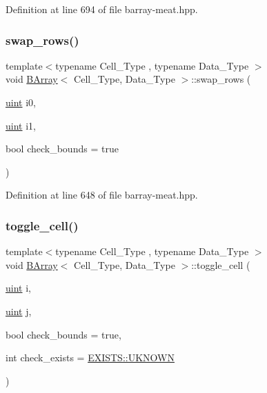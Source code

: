 Definition at line 694 of file barray-\/meat.\+hpp.

\mbox{\label{group__barray-insert_ga742773803481c18e2865b2b2a1e68949}} 
\subsubsection{\texorpdfstring{swap\+\_\+rows()}{swap\_rows()}}
{\footnotesize\ttfamily template$<$typename Cell\+\_\+\+Type , typename Data\+\_\+\+Type $>$ \\
void \hyperlink{class_b_array}{B\+Array}$<$ Cell\+\_\+\+Type, Data\+\_\+\+Type $>$\+::swap\+\_\+rows (\begin{DoxyParamCaption}\item[{\hyperlink{typedefs_8hpp_a91ad9478d81a7aaf2593e8d9c3d06a14}{uint}}]{i0,  }\item[{\hyperlink{typedefs_8hpp_a91ad9478d81a7aaf2593e8d9c3d06a14}{uint}}]{i1,  }\item[{bool}]{check\+\_\+bounds = {\ttfamily true} }\end{DoxyParamCaption})\hspace{0.3cm}{\ttfamily [inline]}}



Definition at line 648 of file barray-\/meat.\+hpp.

\mbox{\label{group__barray-insert_ga2ab2b200b329abc718cfb3574f566cf6}} 
\subsubsection{\texorpdfstring{toggle\+\_\+cell()}{toggle\_cell()}}
{\footnotesize\ttfamily template$<$typename Cell\+\_\+\+Type , typename Data\+\_\+\+Type $>$ \\
void \hyperlink{class_b_array}{B\+Array}$<$ Cell\+\_\+\+Type, Data\+\_\+\+Type $>$\+::toggle\+\_\+cell (\begin{DoxyParamCaption}\item[{\hyperlink{typedefs_8hpp_a91ad9478d81a7aaf2593e8d9c3d06a14}{uint}}]{i,  }\item[{\hyperlink{typedefs_8hpp_a91ad9478d81a7aaf2593e8d9c3d06a14}{uint}}]{j,  }\item[{bool}]{check\+\_\+bounds = {\ttfamily true},  }\item[{int}]{check\+\_\+exists = {\ttfamily \hyperlink{namespace_e_x_i_s_t_s_a81eb362d951445c658942a433afddb97}{E\+X\+I\+S\+T\+S\+::\+U\+K\+N\+O\+WN}} }\end{DoxyParamCaption})\hspace{0.3cm}{\ttfamily [inline]}}



